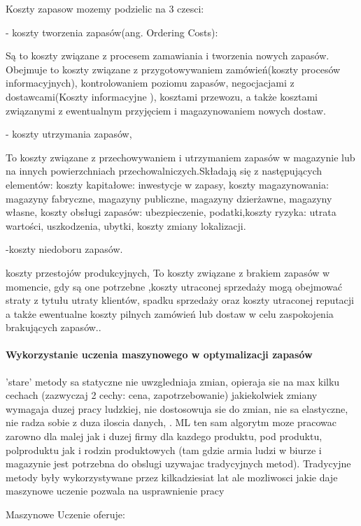 Koszty zapasow mozemy podzielic na 3 czesci:


   - koszty tworzenia zapasów(ang. Ordering Costs):

    Są to koszty związane z procesem zamawiania i tworzenia nowych zapasów. Obejmuje to koszty związane z przygotowywaniem zamówień(koszty procesów informacyjnych), kontrolowaniem poziomu zapasów, negocjacjami z dostawcami(Koszty informacyjne ), kosztami przewozu, a także kosztami związanymi z ewentualnym przyjęciem i magazynowaniem nowych dostaw.
  
   
   - koszty utrzymania zapasów,

   To koszty związane z przechowywaniem i utrzymaniem zapasów w magazynie lub na innych powierzchniach przechowalniczych.Składają się z następujących elementów: koszty kapitałowe: inwestycje w zapasy, koszty magazynowania: magazyny fabryczne, magazyny publiczne, magazyny dzierżawne, magazyny własne, koszty obsługi zapasów: ubezpieczenie, podatki,koszty ryzyka: utrata wartości, uszkodzenia, ubytki, koszty zmiany lokalizacji.
    
  -koszty niedoboru zapasów.

  koszty przestojów produkcyjnych, To koszty związane z brakiem zapasów w momencie, gdy są one potrzebne ,koszty utraconej sprzedaży mogą obejmować straty z tytułu utraty klientów, spadku sprzedaży oraz koszty utraconej reputacji a także ewentualne koszty pilnych zamówień lub dostaw w celu zaspokojenia brakujących zapasów.. 
 
 
\cite{enc2023}\cite{Prav2020}


\paragraph{Wykorzystanie uczenia maszynowego w optymalizacji zapasów}

'stare' metody sa statyczne nie uwzgledniaja zmian, opieraja sie na max kilku cechach (zazwyczaj 2 cechy: cena, zapotrzebowanie) jakiekolwiek zmiany wymagaja duzej pracy ludzkiej, nie dostosowuja sie do zmian, nie sa elastyczne, nie radza sobie z duza iloscia danych, . ML ten sam algorytm moze pracowac zarowno dla malej jak i duzej firmy dla kazdego produktu, pod produktu, polproduktu jak i rodzin produktowych (tam gdzie armia ludzi w biurze i magazynie jest potrzebna do obslugi uzywajac tradycyjnych metod). Tradycyjne metody były wykorzystywane przez kilkadziesiat lat ale mozliwosci jakie daje maszynowe uczenie pozwala na usprawnienie pracy

Maszynowe Uczenie oferuje:

